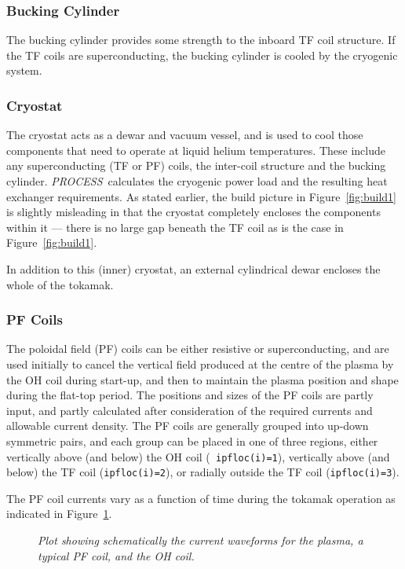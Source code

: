\documentclass[11pt,a4paper]{report}
\newcommand{\PS}{\mbox{\it PROCESS\/ }}
\begin{document}
\subsubsection{Bucking Cylinder}
The bucking cylinder provides some strength to the inboard TF coil
structure. If the TF coils are superconducting, the bucking cylinder is cooled
by the cryogenic system.

\subsubsection{Cryostat}
The cryostat acts as a dewar and vacuum vessel, and is used to cool those
components that need to operate at liquid helium temperatures. These include
any superconducting (TF or PF) coils, the inter-coil structure and the bucking
cylinder. \PS calculates the cryogenic power load and the resulting heat
exchanger requirements. As stated earlier, the build picture in
Figure~\ref{fig:build1} is slightly misleading in that the cryostat completely
encloses the components within it --- there is no large gap beneath the TF
coil as is the case in Figure~\ref{fig:build1}.

In addition to this (inner) cryostat, an external cylindrical dewar encloses
the whole of the tokamak.

\subsubsection{PF Coils}
The poloidal field (PF) coils can be either resistive or superconducting, and
are used initially to cancel the vertical field produced at the centre of the
plasma by the OH coil during start-up, and then to maintain the plasma
position and shape during the flat-top period. The positions and sizes of the
PF coils are partly input, and partly calculated after consideration of the
required currents and allowable current density. The PF coils are generally
grouped into up-down symmetric pairs, and each group can be placed in one of
three regions, either vertically above (and below) the OH coil ({\tt
ipfloc(i)=1}), vertically above (and below) the TF coil ({\tt ipfloc(i)=2}),
or radially outside the TF coil ({\tt ipfloc(i)=3}).

The PF coil currents vary as a function of time during the tokamak operation
as indicated in Figure~\ref{fig:current_vs_time}.

\begin{figure}
\centerline{}
\vspace{-12mm}
\caption[IvsT]
{\it Plot showing schematically the current waveforms for the plasma, a
typical PF coil, and the OH coil.}
\label{fig:current_vs_time}
\end{figure}
\end{document}

